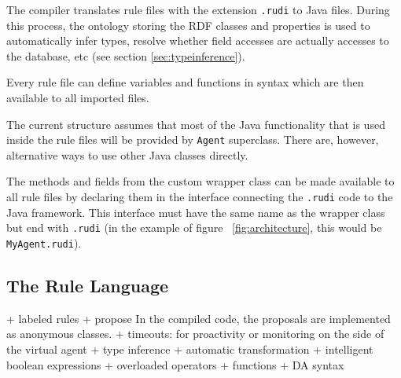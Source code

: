 The \vonda compiler translates rule files with the extension \texttt{.rudi} to Java files. During this process, the ontology storing the RDF classes and properties is used to automatically infer types, resolve whether field accesses are actually accesses to the database, etc (see section \ref{sec:typeinference}).

Every rule file can define variables and functions in \vonda syntax which are
then available to all imported files.

The current structure assumes that most of the Java functionality that is used
inside the rule files will be provided by \texttt{Agent} superclass. There are,
however, alternative ways to use other Java classes directly.

The methods and fields from the custom wrapper class can be made available to all rule files by declaring them in the interface connecting the \texttt{.rudi} code to the Java framework. This interface must have the same name as the wrapper class but end with \texttt{.rudi} (in the example of figure ~\ref{fig:architecture}, this would be \texttt{MyAgent.rudi}).





\subsection{The \vonda Rule Language}

\label{sec:language}

+ labeled rules
+ propose
  In the compiled code, the proposals are implemented as anonymous classes.
+ timeouts: for proactivity or monitoring on the side of the virtual agent
+ type inference
+ automatic transformation
+ intelligent boolean expressions
+ overloaded operators
+ functions
+ DA syntax

